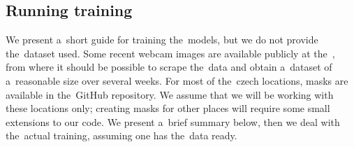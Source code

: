 \subsection{Running training} \label{running_training}

We present a~short guide for training the~models, but we do not provide the~dataset used. Some recent webcam images are available publicly at the~\citep{chmi_webcams}, from where it should be possible to scrape the~data and obtain a~dataset of a~reasonable size over several weeks. For most of the~czech locations, masks are available in the~GitHub repository. We assume that we will be working with these locations only; creating masks for other places will require some small extensions to our code. We present a~brief summary below, then we deal with the~actual training, assuming one has the~data ready.

